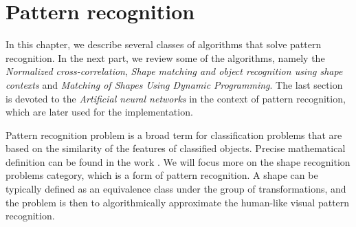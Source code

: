 \chapter{Pattern recognition}
In this chapter, we describe several classes of algorithms that solve pattern recognition. In the next part, we review some of the algorithms, namely the \emph{Normalized cross-correlation}, \emph{Shape matching and object recognition using shape contexts} and \emph{Matching of Shapes Using Dynamic Programming}. The last section is devoted to the \emph{Artificial neural networks} in the context of pattern recognition, which are later used for the implementation.

Pattern recognition problem is a broad term for classification problems that are based on the similarity of the features of classified objects. Precise mathematical definition can be found in the work \citet{formalMethods}. We will focus more on the shape recognition problems category, which is a form of pattern recognition. A shape can be typically defined as an equivalence class under the group of transformations, and the problem is then to algorithmically approximate the human-like visual pattern recognition. 


